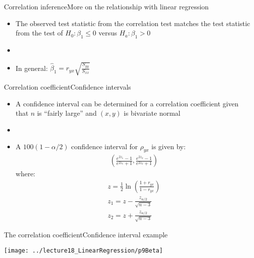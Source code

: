 \documentclass[xcolor=dvipsnames]{beamer}
\begin{document}
\begin{frame}{Correlation inference}{More on the relationship with linear regression}
	\begin{itemize}
		\item The observed test statistic from the correlation test matches the test statistic from the test of $H_0: \beta_1 \leq 0$ versus $H_a: \beta_1 >0$
		\item[]
		\item In general: $\hat{\beta}_1 = r_{yx} \sqrt{\frac{S_{yy}}{S_{xx}}}$
	\end{itemize}
\end{frame}

\begin{frame}{Correlation coefficient}{Confidence intervals}
	\begin{itemize}
		\item A confidence interval can be determined for a correlation coefficient given that $n$ is ``fairly large'' and $(x,y)$ is bivariate normal
		\item[]
		\item A $100(1-\alpha /2)$ confidence interval for $\rho_{yx}$ is given by:
		\begin{gather*}
		\left(\frac{e^{2 z_1}-1}{e^{2 z_1}+1}, \frac{e^{2 z_2}-1}{e^{2 z_2}+1} \right)
		\end{gather*}
		where:
		\begin{gather*}
		z = \frac{1}{2} \ln \left( \frac{1+r_{yx}}{1-r_{yx}} \right) \\
		z_1 = z - \frac{z_{\alpha / 2}}{\sqrt{n-3}} \\
		z_2 = z + \frac{z_{\alpha / 2}}{\sqrt{n-3}}
		\end{gather*}
	\end{itemize}
\end{frame}

\begin{frame}{The correlation coefficient}{Confidence interval example}
	\begin{center}
		\texttt{[image: ../lecture18\_LinearRegression/p9Beta]}
	\end{center}
\end{frame}
\end{document}

